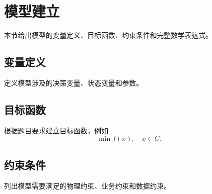 \section{模型建立}

本节给出模型的变量定义、目标函数、约束条件和完整数学表达式。

\subsection{变量定义}

定义模型涉及的决策变量、状态变量和参数。

\subsection{目标函数}

根据题目要求建立目标函数，例如
\begin{equation}
  \min f(x), \quad x \in C.
\end{equation}

\subsection{约束条件}

列出模型需要满足的物理约束、业务约束和数据约束。
